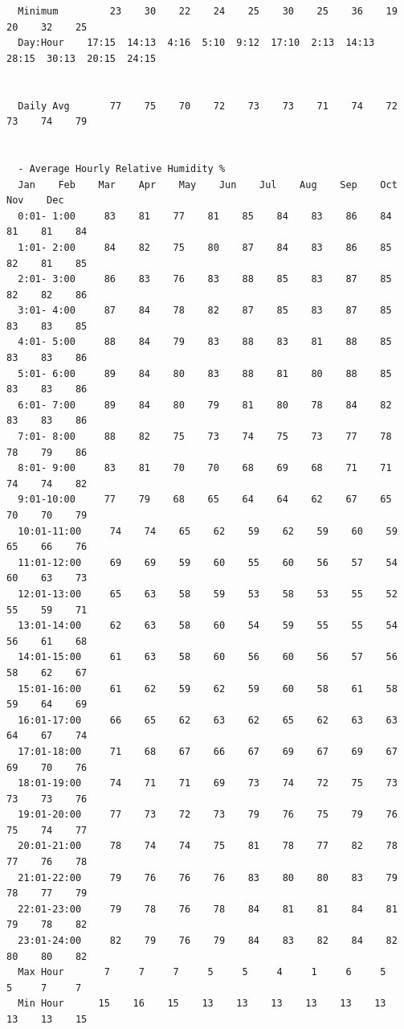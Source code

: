 \begin{lstlisting}
  Minimum         23    30    22    24    25    30    25    36    19    20    32    25
  Day:Hour    17:15  14:13  4:16  5:10  9:12  17:10  2:13  14:13  28:15  30:13  20:15  24:15


  Daily Avg       77    75    70    72    73    73    71    74    72    73    74    79


  - Average Hourly Relative Humidity %
  Jan    Feb    Mar    Apr    May    Jun    Jul    Aug    Sep    Oct    Nov    Dec
  0:01- 1:00     83    81    77    81    85    84    83    86    84    81    81    84
  1:01- 2:00     84    82    75    80    87    84    83    86    85    82    81    85
  2:01- 3:00     86    83    76    83    88    85    83    87    85    82    82    86
  3:01- 4:00     87    84    78    82    87    85    83    87    85    83    83    85
  4:01- 5:00     88    84    79    83    88    83    81    88    85    83    83    86
  5:01- 6:00     89    84    80    83    88    81    80    88    85    83    83    86
  6:01- 7:00     89    84    80    79    81    80    78    84    82    83    83    86
  7:01- 8:00     88    82    75    73    74    75    73    77    78    78    79    86
  8:01- 9:00     83    81    70    70    68    69    68    71    71    74    74    82
  9:01-10:00     77    79    68    65    64    64    62    67    65    70    70    79
  10:01-11:00     74    74    65    62    59    62    59    60    59    65    66    76
  11:01-12:00     69    69    59    60    55    60    56    57    54    60    63    73
  12:01-13:00     65    63    58    59    53    58    53    55    52    55    59    71
  13:01-14:00     62    63    58    60    54    59    55    55    54    56    61    68
  14:01-15:00     61    63    58    60    56    60    56    57    56    58    62    67
  15:01-16:00     61    62    59    62    59    60    58    61    58    59    64    69
  16:01-17:00     66    65    62    63    62    65    62    63    63    64    67    74
  17:01-18:00     71    68    67    66    67    69    67    69    67    69    70    76
  18:01-19:00     74    71    71    69    73    74    72    75    73    73    73    76
  19:01-20:00     77    73    72    73    79    76    75    79    76    75    74    77
  20:01-21:00     78    74    74    75    81    78    77    82    78    77    76    78
  21:01-22:00     79    76    76    76    83    80    80    83    79    78    77    79
  22:01-23:00     79    78    76    78    84    81    81    84    81    79    78    82
  23:01-24:00     82    79    76    79    84    83    82    84    82    80    80    82
  Max Hour       7     7     7     5     5     4     1     6     5     5     7     7
  Min Hour      15    16    15    13    13    13    13    13    13    13    13    15



\end{lstlisting}
